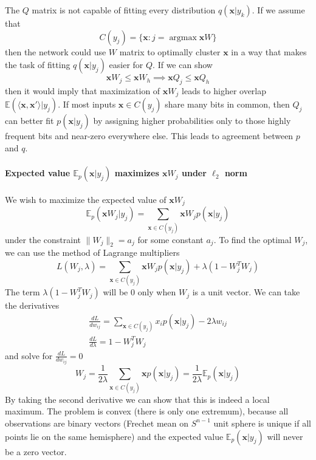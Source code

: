 \documentclass[12pt]{article}
\DeclareMathOperator*{\argmax}{argmax}
\begin{document}
The $Q$ matrix is not capable of fitting every distribution $q(\boldsymbol{x}|y_k)$.
If we assume that
\[
C(y_j) = \{\boldsymbol{x}:j=\argmax \boldsymbol{x}W\}
\]
then the network could use $W$ matrix to optimally cluster $\boldsymbol{x}$ in a way that makes the task of fitting $q(\boldsymbol{x}|y_j)$ easier for $Q$. If we can show
\[
\boldsymbol{x}W_j \le \boldsymbol{x}W_h  \implies  \boldsymbol{x}Q_j \le \boldsymbol{x}Q_h 
\]
then it would imply that maximization of $\boldsymbol{x}W_j$ leads to higher overlap
$\mathbb{E}(\langle \boldsymbol{x}, \boldsymbol{x}'\rangle|y_j) $. If most inputs $\boldsymbol{x}\in C(y_j)$ share many bits in common, then $Q_j$ can better fit $p(\boldsymbol{x}|y_j)$ by assigning higher probabilities only to those highly frequent bits and near-zero everywhere else. This leads to agreement between $p$ and $q$. 
\fi


\paragraph{Expected value $\mathbb{E}_{p}(\boldsymbol{x}|y_j)$ maximizes $\boldsymbol{x}W_j$ under $\ell_2$ norm} 

We wish to maximize the expected value of $\boldsymbol{x}W_j$
\[
\mathbb{E}_{p}(\boldsymbol{x}W_j|y_j)=\sum_{\boldsymbol{x}\in C(y_j)} \boldsymbol{x} W_j p(\boldsymbol{x}|y_j)
\]
 under the constraint $\lVert W_j \rVert_2 = a_j$ for some constant $a_j$.  To find the optimal $W_j$, we can use the method of Lagrange multipliers
\[
L(W_j,\lambda) = \sum_{\boldsymbol{x}\in C(y_j)} \boldsymbol{x} W_j p(\boldsymbol{x}|y_j) + \lambda(1- W_j^{T}W_j )
\]
The term $\lambda(1- W_j^{T}W_j)$ will be $0$ only when $W_j$ is a unit vector.
We can take the derivatives 
\begin{gather*}
	\frac{d L}{d w_{ij}} = \sum_{\boldsymbol{x}\in C(y_j)} x_i p(\boldsymbol{x}|y_j) - 2\lambda w_{ij} \\
	\frac{d L}{d \lambda} = 1 - W_j^{T}W_j
\end{gather*}
and solve for $\frac{d L}{d w_{ij}}=0$
\[
W_j = \frac{1}{2\lambda }\sum_{\boldsymbol{x}\in C(y_j)} \boldsymbol{x} p(\boldsymbol{x}|y_j)  = \frac{1}{2\lambda } \mathbb{E}_{p}(\boldsymbol{x}|y_j)
\]
By taking the second derivative we can show that this is indeed a local maximum.
The problem is convex (there is only one extremum), because all observations are binary vectors (Frechet mean on $S^{n-1}$ unit sphere is unique if all points lie on the same hemisphere) and the expected value $\mathbb{E}_{p}(\boldsymbol{x}|y_j)$ will never be a zero vector.
\end{document}
